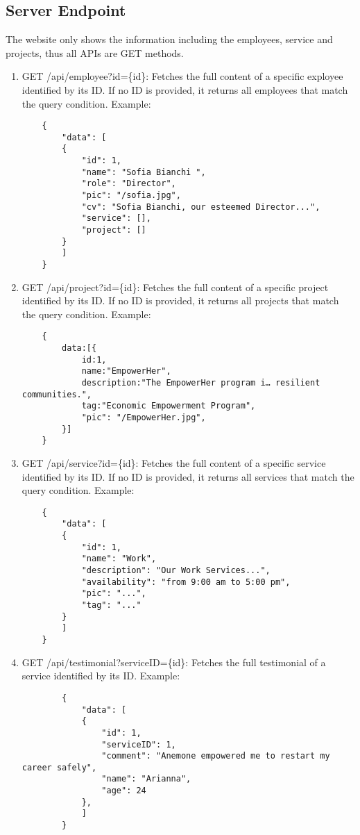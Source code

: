 \subsection{Server Endpoint}
The website only shows the information including the employees, service and projects, thus all APIs are GET methods.
\begin{enumerate}
	\item GET /api/employee?id=\{id\}: Fetches the full content of a specific exployee identified by its ID. If no ID is provided, it returns all employees that match the query condition.
	Example:
	\begin{verbatim}
	{
		"data": [
		{
			"id": 1,
			"name": "Sofia Bianchi ",
			"role": "Director",
			"pic": "/sofia.jpg",
			"cv": "Sofia Bianchi, our esteemed Director...",
			"service": [],
			"project": []
		}
		]
	}
	\end{verbatim}
	\item GET /api/project?id=\{id\}: Fetches the full content of a specific project identified by its ID. If no ID is provided, it returns all projects that match the query condition. 
	Example:
	\begin{verbatim}
	{
		data:[{	
			id:1,
			name:"EmpowerHer",
			description:"The EmpowerHer program i… resilient communities.",
			tag:"Economic Empowerment Program",
			"pic": "/EmpowerHer.jpg",
		}]
	}
	\end{verbatim}
	\item GET /api/service?id=\{id\}: Fetches the full content of a specific service identified by its ID. If no ID is provided, it returns all services that match the query condition.
	Example:
	\begin{verbatim}
	{
		"data": [
		{
			"id": 1,
			"name": "Work",
			"description": "Our Work Services...",
			"availability": "from 9:00 am to 5:00 pm",
			"pic": "...",
			"tag": "..."
		}
		]
	}
	\end{verbatim}
		\item GET /api/testimonial?serviceID=\{id\}: Fetches the full testimonial of a service identified by its ID.
	Example:
	\begin{verbatim}
		{
			"data": [
			{
				"id": 1,
				"serviceID": 1,
				"comment": "Anemone empowered me to restart my career safely",
				"name": "Arianna",
				"age": 24
			},
			]
		}
	\end{verbatim}
\end{enumerate}